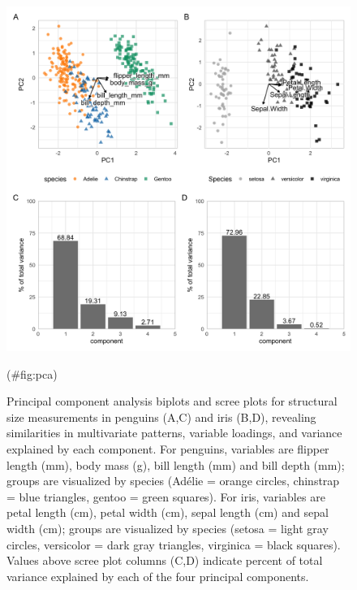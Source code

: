 \begin{Schunk}
\begin{figure}[htbp]

{\centering \includegraphics[width=6in]{fig/pca_plots} 

}

\caption[Principal component analysis biplots and scree plots for structural size measurements in penguins (A,C) and iris (B,D), revealing similarities in multivariate patterns, variable loadings, and variance explained by each component]{Principal component analysis biplots and scree plots for structural size measurements in penguins (A,C) and iris (B,D), revealing similarities in multivariate patterns, variable loadings, and variance explained by each component. For penguins, variables are flipper length (mm), body mass (g), bill length (mm) and bill depth (mm); groups are visualized by species (Adélie = orange circles, chinstrap = blue triangles, gentoo = green squares). For iris, variables are petal length (cm), petal width (cm), sepal length (cm) and sepal width (cm); groups are visualized by species (setosa = light gray circles, versicolor = dark gray triangles, virginica = black squares). Values above scree plot columns (C,D) indicate percent of total variance explained by each of the four principal components.}(\#fig:pca)
\end{figure}
\end{Schunk}


